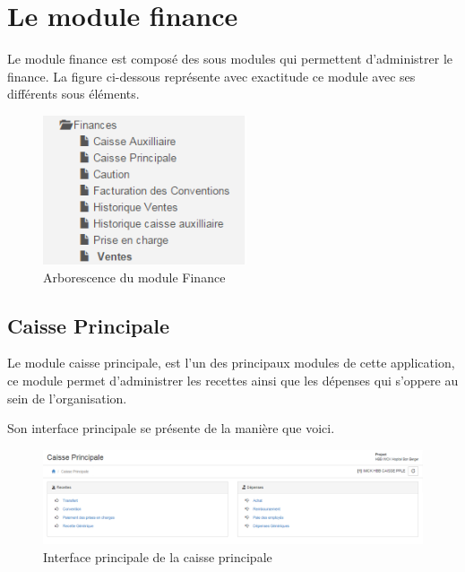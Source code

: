 \documentclass[12pt,a4paper]{report}
\begin{document}
\newpage
\chapter{Le module finance}        
Le module finance est composé des sous modules qui permettent d'administrer le finance. La figure ci-dessous représente avec exactitude ce module avec ses différents sous éléments.

\begin{figure}[h]
\begin{center}
\includegraphics[width=6cm]{pic/FinanceArbo.png}
\end{center}
\caption{Arborescence du module Finance}
\label{Arborescence du module Finance}
\end{figure}



\newpage 
\section{Caisse Principale}
Le module caisse principale, est l'un des principaux modules de cette application, ce module permet d'administrer les recettes ainsi que les dépenses qui s'oppere au sein de l'organisation.

Son interface principale se présente de la manière que voici.

\begin{figure}[h]
\begin{center}
\includegraphics[width=14cm]{pic/caissePrincipale.png}
\end{center}
\caption{Interface principale de la caisse principale}
\label{Interface principale de la caisse principale}
\end{figure}
\end{document}

